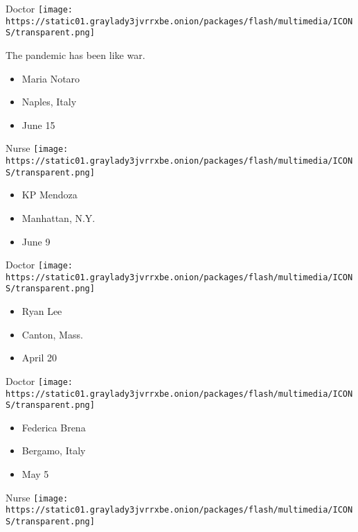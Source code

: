 \protect\hyperlink{item-maria-notaro}{}

Doctor
\texttt{[image: https://static01.graylady3jvrrxbe.onion/packages/flash/multimedia/ICONS/transparent.png]}

The pandemic has been like war.

\begin{itemize}
\tightlist
\item
  Maria Notaro
\item
  Naples, Italy
\item
  June 15
\end{itemize}

\protect\hyperlink{item-kp-mendoza}{}

Nurse
\texttt{[image: https://static01.graylady3jvrrxbe.onion/packages/flash/multimedia/ICONS/transparent.png]}

\begin{itemize}
\tightlist
\item
  KP Mendoza
\item
  Manhattan, N.Y.
\item
  June 9
\end{itemize}

\protect\hyperlink{item-ryan-lee}{}

Doctor
\texttt{[image: https://static01.graylady3jvrrxbe.onion/packages/flash/multimedia/ICONS/transparent.png]}

\begin{itemize}
\tightlist
\item
  Ryan Lee
\item
  Canton, Mass.
\item
  April 20
\end{itemize}

\protect\hyperlink{item-federica-brena}{}

Doctor
\texttt{[image: https://static01.graylady3jvrrxbe.onion/packages/flash/multimedia/ICONS/transparent.png]}

\begin{itemize}
\tightlist
\item
  Federica Brena
\item
  Bergamo, Italy
\item
  May 5
\end{itemize}

\protect\hyperlink{item-josline-azki}{}

Nurse
\texttt{[image: https://static01.graylady3jvrrxbe.onion/packages/flash/multimedia/ICONS/transparent.png]}

